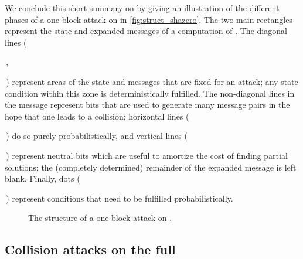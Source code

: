 We conclude this short summary on \shazero by giving an illustration of the different phases of a one-block attack on \shazero in \autoref{fig:struct_shazero}. The two main rectangles represent the state and
expanded messages of a computation of \shazero. The diagonal lines (\,\,,
\,) represent areas of the state and messages that are fixed for an attack; any state condition within this zone is deterministically fulfilled.
The non-diagonal lines in the message represent bits that are used to generate many message pairs in the hope that one leads to a collision; horizontal lines
(\,\,) do so purely probabilistically, and vertical lines
(\,\,)
represent neutral bits which are useful to amortize the cost of finding partial solutions; the (completely determined) remainder of the expanded message is left blank.
Finally, dots
(\,\,)
represent conditions that need to be fulfilled probabilistically.

\begin{figure}[!htb]
\begin{center}

\end{center}
\caption{The structure of a one-block attack on \shazero.\label{fig:struct_shazero}}
\end{figure}

\subsection{Collision attacks on the full \shaone}
\label{sec:full_sha1}

